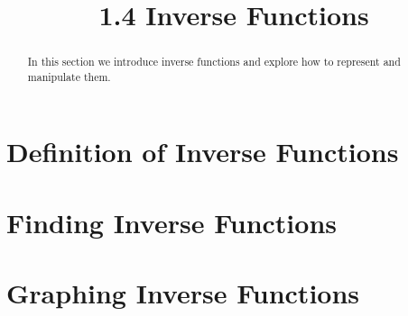 \documentclass[handout]{ximera}
\title{1.4 Inverse Functions}
\begin{document}
\begin{abstract}
In this section we introduce inverse functions and explore how to represent and manipulate them.
\end{abstract}

\maketitle


\section{Definition of Inverse Functions}

\section{Finding Inverse Functions}

\section{Graphing Inverse Functions}
\end{document}
